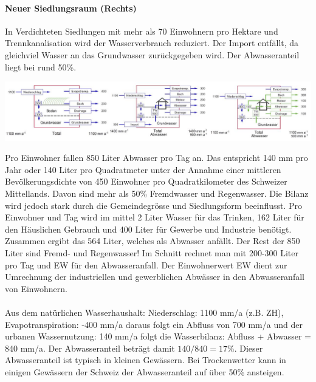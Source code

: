 \documentclass[9pt, openright=false]{scrartcl}
\begin{document}
\paragraph{Neuer Siedlungsraum (Rechts)}
In Verdichteten Siedlungen mit mehr als 70 Einwohnern pro Hektare und Trennkanalisation wird der Wasserverbrauch reduziert. Der Import entfällt, da gleichviel Wasser an das Grundwasser zurückgegeben wird. Der Abwasseranteil liegt bei rund 50\%.
\begin{center}
\includegraphics[width=\textwidth]{images/detailbillanzen}
\end{center}
Pro Einwohner fallen 850 Liter Abwasser pro Tag an. Das entspricht 140 mm pro Jahr oder 140 Liter pro Quadratmeter unter der Annahme einer mittleren Bevölkerungsdichte von 450 Einwohner pro Quadratkilometer des Schweizer Mittellands.  Davon sind mehr als 50\% Fremdwasser und Regenwasser. Die Bilanz wird jedoch stark durch die Gemeindegrösse und Siedlungsform beeinflusst. Pro Einwohner und Tag wird im mittel 2 Liter Wasser für das Trinken, 162 Liter für den Häuslichen Gebrauch und 400 Liter für Gewerbe und Industrie benötigt. Zusammen ergibt das 564 Liter, welches als Abwasser anfällt. Der Rest der 850 Liter sind Fremd- und Regenwasser! Im Schnitt rechnet man mit 200-300 Liter pro Tag und EW für den Abwasseranfall. Der Einwohnerwert EW dient zur Umrechnung der industriellen und gewerblichen Abwässer in den Abwasseranfall von Einwohnern.\\ \\
Aus dem natürlichen Wasserhaushalt: Niederschlag: 1100 mm/a (z.B. ZH), Evapotranspiration: -400 mm/a daraus folgt ein Abfluss von 700 mm/a und der urbanen Wassernutzung: 140 mm/a folgt die Wasserbilanz: Abfluss + Abwasser = 840 mm/a. Der Abwasseranteil beträgt damit $140/ 840 = 17\%$. Dieser Abwasseranteil ist typisch in kleinen Gewässern. Bei Trockenwetter kann in einigen Gewässern der Schweiz der Abwasseranteil auf über 50\% ansteigen.
\end{document}
